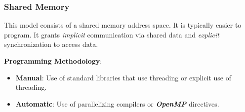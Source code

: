 \subsubsection{Shared Memory}
\begin{minipage}{0.5\textwidth}
    \par This model consists of a shared memory address space. It is typically easier to program. It grants \textit{implicit} communication via shared data and \textit{explicit} synchronization to access data.
    \\
    \par \textbf{Programming Methodology}:
    \begin{itemize}
        \item \textbf{Manual}: Use of standard libraries that use threading or explicit use of threading.
        \item \textbf{Automatic}: Use of parallelizing compilers or \textit{\textbf{OpenMP}} directives.
    \end{itemize}
\end{minipage}
\begin{minipage}{0.5\textwidth}
    \centering
\end{minipage}
